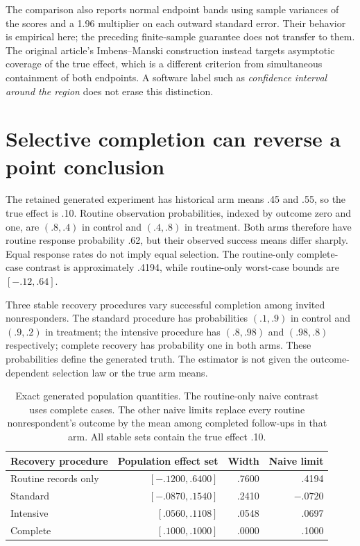 The comparison also reports normal endpoint bands using sample variances of
the scores and a 1.96 multiplier on each outward standard error. Their
behavior is empirical here; the preceding finite-sample guarantee does not
transfer to them. The original article's Imbens--Manski construction instead
targets asymptotic coverage of the true effect, which is a different
criterion from simultaneous containment of both endpoints. A software label
such as \emph{confidence interval around the region} does not erase this
distinction. \citep{rel73coppock2017,rel73attrition}

\section{Selective completion can reverse a point conclusion}

The retained generated experiment has historical arm means .45 and .55,
so the true effect is .10. Routine observation probabilities, indexed by
outcome zero and one, are $(.8,.4)$ in control and $(.4,.8)$ in treatment.
Both arms therefore have routine response probability .62, but their observed
success means differ sharply. Equal response rates do not imply equal
selection. The routine-only complete-case contrast is approximately .4194,
while routine-only worst-case bounds are $[-.12,.64]$.

Three stable recovery procedures vary successful completion among invited
nonresponders. The standard procedure has probabilities $(.1,.9)$ in control
and $(.9,.2)$ in treatment; the intensive procedure has $(.8,.98)$ and
$(.98,.8)$ respectively; complete recovery has probability one in both
arms. These probabilities define the generated truth. The estimator is not
given the outcome-dependent selection law or the true arm means.

\begin{table}[htbp]
\centering\small
\begin{tabular}{lrrr}
\toprule
Recovery procedure & Population effect set & Width & Naive limit\\
\midrule
Routine records only & $[-.1200,.6400]$ & .7600 & .4194\\
Standard & $[-.0870,.1540]$ & .2410 & $-.0720$\\
Intensive & $[.0560,.1108]$ & .0548 & .0697\\
Complete & $[.1000,.1000]$ & .0000 & .1000\\
\bottomrule
\end{tabular}
\caption{Exact generated population quantities. The routine-only naive
contrast uses complete cases. The other naive limits replace every routine
nonrespondent's outcome by the mean among completed follow-ups in that arm.
All stable sets contain the true effect .10.}
\label{rel73:population}
\end{table}

